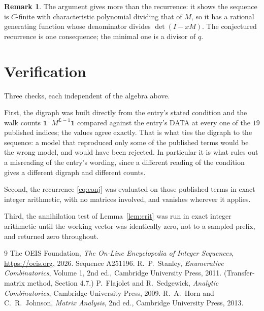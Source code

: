 \documentclass[11pt,a4paper]{article}
\theoremstyle{plain}
\theoremstyle{definition}
\newtheorem{remark}[theorem]{Remark}
\begin{document}
\begin{remark}
The argument gives more than the recurrence: it shows the sequence is $C$-finite with
characteristic polynomial dividing that of $M$, so it has a rational generating function
whose denominator divides $\det(I-xM)$. The conjectured recurrence is one consequence; the
minimal one is a divisor of $q$.
\end{remark}

\section{Verification}

Three checks, each independent of the algebra above.

First, the digraph was built directly from the entry's stated condition and the walk counts
$\mathbf{1}^{\!\top}M^{L-1}\mathbf{1}$ compared against the entry's DATA at
every one of the $19$ published indices; the values agree exactly. That is what ties
the digraph to the sequence: a model that reproduced only some of the published terms would
be the wrong model, and would have been rejected. In particular it is what rules out a
misreading of the entry's wording, since a different reading of the condition gives a
different digraph and different counts.

Second, the recurrence \eqref{eq:conj} was evaluated on those published terms in exact
integer arithmetic, with no matrices involved, and vanishes wherever it applies.

Third, the annihilation test of Lemma~\ref{lem:crit} was run in exact integer arithmetic
until the working vector was identically zero, not to a sampled prefix, and returned zero
throughout.

\begin{thebibliography}{9}
 The OEIS Foundation, \emph{The On-Line Encyclopedia of Integer
Sequences}, \url{https://oeis.org}, 2026. Sequence A251196.
 R.~P.~Stanley, \emph{Enumerative Combinatorics}, Volume 1, 2nd ed.,
Cambridge University Press, 2011. (Transfer-matrix method, Section 4.7.)
 P.~Flajolet and R.~Sedgewick, \emph{Analytic Combinatorics}, Cambridge
University Press, 2009.
 R.~A.~Horn and C.~R.~Johnson, \emph{Matrix Analysis}, 2nd ed., Cambridge
University Press, 2013.
\end{thebibliography}
\end{document}
